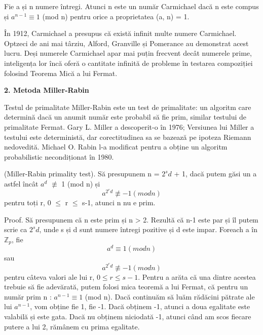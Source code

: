 \documentclass[runningheads]{llncs}
\begin{document}
\begin{definition}
    Fie a și n numere întregi. Atunci n este un număr Carmichael dacă n este compus și $a^{n-1} \equiv 1$ (mod n)
    pentru orice a proprietatea (a, n) = 1.
\end{definition}
În 1912, Carmichael a presupus că există infinit multe numere Carmichael. Optzeci de ani mai târziu, Alford, Granville
și Pomerance au demonstrat acest lucru. Deși numerele Carmichael apar mai puțin frecvent decât numerele prime, inteligența
lor încă oferă o cantitate infinită de probleme în testarea compoziției folosind Teorema Mică a lui Fermat. \newline

\textbf{2. Metoda Miller-Rabin} \newline

Testul de primalitate Miller-Rabin este un test de primalitate: un algoritm care determină dacă un anumit număr este
probabil să fie prim, similar testului de primalitate Fermat. Gary L. Miller a descoperit-o în 1976; Versiunea lui
Miller a testului este deterministă, dar corectitudinea sa se bazează pe ipoteza Riemann nedovedită.
Michael O. Rabin l-a modificat pentru a obține un algoritm probabilistic necondiționat în 1980.

\begin{theorem}
    (Miller-Rabin primality test). Să presupunem n = $2^{s}d$ + 1, dacă putem găsi un a astfel încât $a^{d}$ $\not\equiv$ 1 (mod n) și
    \begin{equation*}
        a^{2^{r}d} \not\equiv -1 (mod n)
    \end{equation*}
    pentru toți r, 0 $\leq$ r $\leq$ s-1, atunci n nu e prim.
\end{theorem}

Proof. Să presupunem că n este prim și n > 2. Rezultă că n-1 este par și îl putem scrie ca $2^{s}d$, unde s și d sunt numere întregi
pozitive și d este impar. Foreach a în $\mathbb{Z}{_p}$, fie
\begin{equation*}
    a^{d} \equiv 1 (mod n)
\end{equation*}
sau
\begin{equation*}
    a^{2^{r}d} \not\equiv -1 (mod n)
\end{equation*}
pentru câteva valori ale lui r, $0 \leq r \leq s-1$. Pentru a arăta că una dintre acestea trebuie să fie adevărată, putem folosi mica teoremă
a lui Fermat, că pentru un număr prim n : $a^{n-1} \equiv 1$ (mod n). Dacă continuăm să luăm rădăcini pătrate ale lui $a^{n-1}$,
vom obține fie 1, fie -1. Dacă obținem -1, atunci a doua egalitate este valabilă și este gata. Dacă nu obținem niciodată -1,
atunci când am scos fiecare putere a lui 2, rămânem cu prima egalitate.
\end{document}
